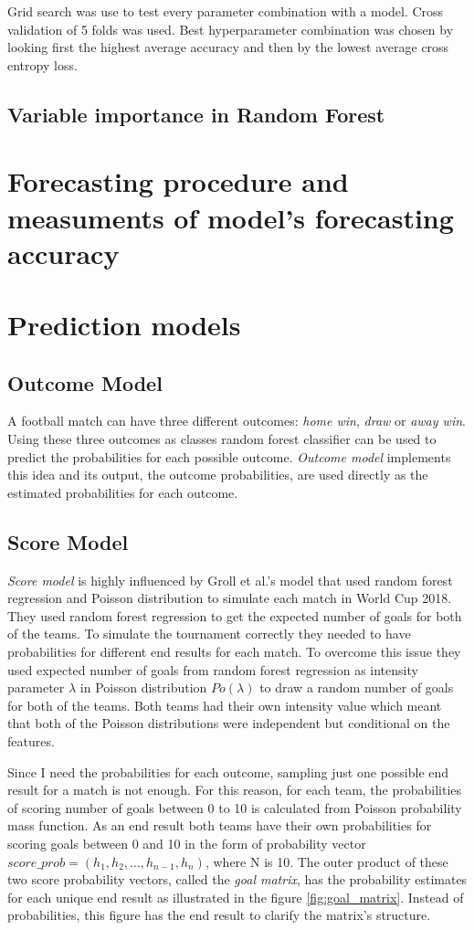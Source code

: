 Grid search was use to test every parameter combination with a model. Cross validation of 5 folds was used. Best hyperparameter combination was chosen by looking first the highest average accuracy and then by the lowest average cross entropy loss.


\subsection{Variable importance in Random Forest}
\section{Forecasting procedure and measuments of model's forecasting accuracy}

\section{Prediction models}

\subsection{Outcome Model}
A football match can have three different outcomes: \textit{home win}, \textit{draw} or \textit{away win}. Using these three outcomes as classes random forest classifier can be used to predict the probabilities for each possible outcome. \textit{Outcome model} implements this idea and its output, the outcome probabilities, are used directly as the estimated probabilities for each outcome.
\subsection{Score Model}
\textit{Score model} is highly influenced by Groll et al.'s \cite{groll2018prediction} model that used random forest regression and Poisson distribution to simulate each match in World Cup 2018. They used random forest regression to get the expected number of goals for both of the teams. To simulate the tournament correctly they needed to have probabilities for different end results for each match. To overcome this issue they used expected number of goals from random forest regression as intensity parameter $\lambda$ in Poisson distribution $Po(\lambda)$ to draw a random number of goals for both of the teams. Both teams had their own intensity value which meant that both of the Poisson distributions were independent but conditional on the features.

Since I need the probabilities for each outcome, sampling just one possible end result for a match is not enough. For this reason, for each team, the probabilities of scoring number of goals between 0 to 10 is calculated from Poisson probability mass function. As an end result both teams have their own probabilities for scoring goals between 0 and 10 in the form of probability vector $score\_prob = \left( h _ { 1 } , h _ { 2 } , \dots , h _ { n - 1 } , h _ { n } \right)$, where N is 10. The outer product of these two score probability vectors, called the \textit{goal matrix}, has the probability estimates for each unique end result as illustrated in the figure \ref{fig:goal_matrix}. Instead of probabilities, this figure has the end result to clarify the matrix's structure.


